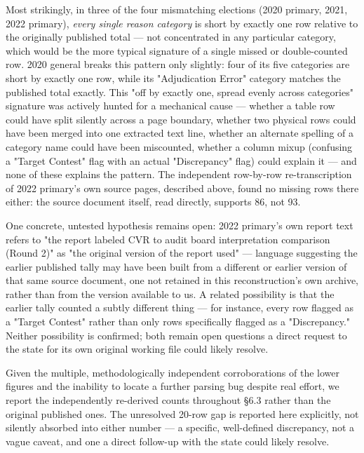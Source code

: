 Most strikingly, in three of the four mismatching elections (2020
primary, 2021, 2022 primary), \textit{every single reason category} is short by
exactly one row relative to the originally published total — not
concentrated in any particular category, which would be the more typical
signature of a single missed or double-counted row. 2020 general breaks
this pattern only slightly: four of its five categories are short by
exactly one row, while its "Adjudication Error" category matches the
published total exactly. This "off by exactly one, spread evenly across
categories" signature was actively hunted for a mechanical cause —
whether a table row could have split silently across a page boundary,
whether two physical rows could have been merged into one extracted
text line, whether an alternate spelling of a category name could have
been miscounted, whether a column mixup (confusing a "Target Contest"
flag with an actual "Discrepancy" flag) could explain it — and none of
these explains the pattern. The independent row-by-row re-transcription
of 2022 primary's own source pages, described above, found no missing
rows there either: the source document itself, read directly, supports
86, not 93.

One concrete, untested hypothesis remains open: 2022 primary's own
report text refers to "the report labeled CVR to audit board
interpretation comparison (Round 2)" as "the original version of the
report used" — language suggesting the earlier published tally may have
been built from a different or earlier version of that same source
document, one not retained in this reconstruction's own archive, rather
than from the version available to us. A related possibility is that the
earlier tally counted a subtly different thing — for instance, every row
flagged as a "Target Contest" rather than only rows specifically flagged
as a "Discrepancy." Neither possibility is confirmed; both remain open
questions a direct request to the state for its own original working
file could likely resolve.

Given the multiple, methodologically independent corroborations of the
lower figures and the inability to locate a further parsing bug despite
real effort, we report the independently re-derived counts throughout
§6.3 rather than the original published ones. The unresolved 20-row gap
is reported here explicitly, not silently absorbed into either number —
a specific, well-defined discrepancy, not a vague caveat, and one a
direct follow-up with the state could likely resolve.

